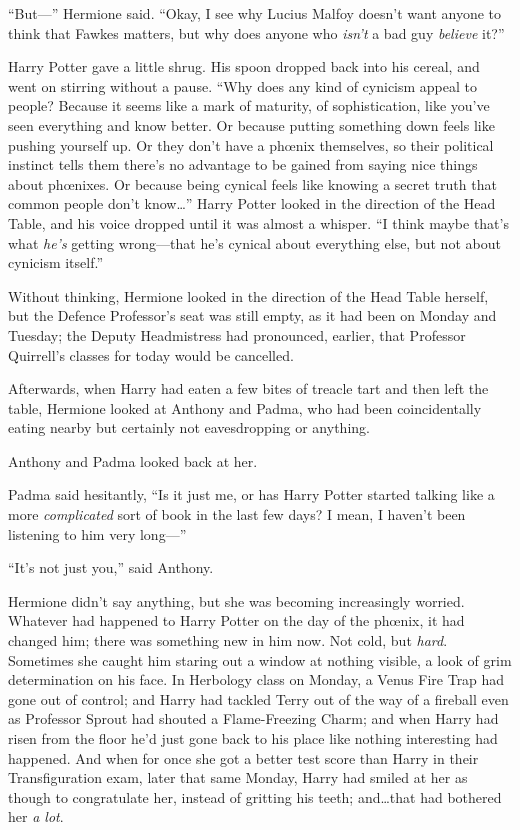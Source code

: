 “But—” Hermione said. “Okay, I see why Lucius Malfoy doesn’t want anyone to think that Fawkes matters, but why does anyone who \emph{isn’t} a bad guy \emph{believe} it?”

Harry Potter gave a little shrug. His spoon dropped back into his cereal, and went on stirring without a pause. “Why does any kind of cynicism appeal to people? Because it seems like a mark of maturity, of sophistication, like you’ve seen everything and know better. Or because putting something down feels like pushing yourself up. Or they don’t have a phœnix themselves, so their political instinct tells them there’s no advantage to be gained from saying nice things about phœnixes. Or because being cynical feels like knowing a secret truth that common people don’t know…” Harry Potter looked in the direction of the Head Table, and his voice dropped until it was almost a whisper. “I think maybe that’s what \emph{he’s} getting wrong—that he’s cynical about everything else, but not about cynicism itself.”

Without thinking, Hermione looked in the direction of the Head Table herself, but the Defence Professor’s seat was still empty, as it had been on Monday and Tuesday; the Deputy Headmistress had pronounced, earlier, that Professor Quirrell’s classes for today would be cancelled.

Afterwards, when Harry had eaten a few bites of treacle tart and then left the table, Hermione looked at Anthony and Padma, who had been coincidentally eating nearby but certainly not eavesdropping or anything.

Anthony and Padma looked back at her.

Padma said hesitantly, “Is it just me, or has Harry Potter started talking like a more \emph{complicated} sort of book in the last few days? I mean, I haven’t been listening to him very long—”

“It’s not just you,” said Anthony.

Hermione didn’t say anything, but she was becoming increasingly worried. Whatever had happened to Harry Potter on the day of the phœnix, it had changed him; there was something new in him now. Not cold, but \emph{hard}. Sometimes she caught him staring out a window at nothing visible, a look of grim determination on his face. In Herbology class on Monday, a Venus Fire Trap had gone out of control; and Harry had tackled Terry out of the way of a fireball even as Professor Sprout had shouted a Flame-Freezing Charm; and when Harry had risen from the floor he’d just gone back to his place like nothing interesting had happened. And when for once she got a better test score than Harry in their Transfiguration exam, later that same Monday, Harry had smiled at her as though to congratulate her, instead of gritting his teeth; and…that had bothered her \emph{a lot}.

